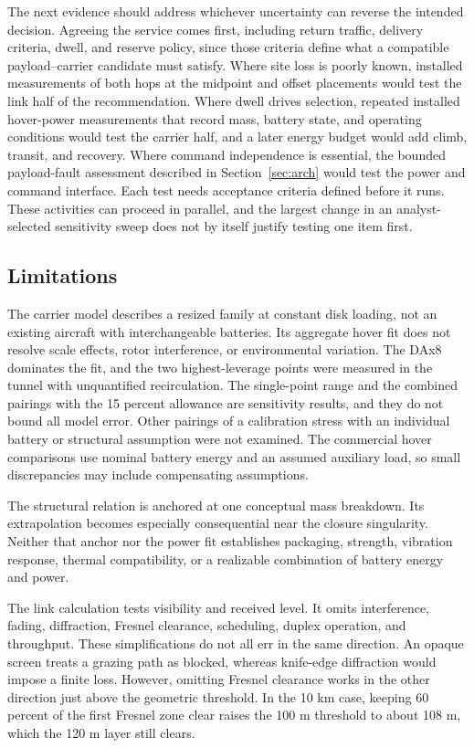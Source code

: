 \documentclass[twocolumn,letterpaper]{IEEEAerospaceCLS}
\begin{document}
The next evidence should address whichever uncertainty can reverse the intended decision. Agreeing the service comes first, including return traffic, delivery criteria, dwell, and reserve policy, since those criteria define what a compatible payload--carrier candidate must satisfy. Where site loss is poorly known, installed measurements of both hops at the midpoint and offset placements would test the link half of the recommendation. Where dwell drives selection, repeated installed hover-power measurements that record mass, battery state, and operating conditions would test the carrier half, and a later energy budget would add climb, transit, and recovery. Where command independence is essential, the bounded payload-fault assessment described in Section~\ref{sec:arch} would test the power and command interface. Each test needs acceptance criteria defined before it runs. These activities can proceed in parallel, and the largest change in an analyst-selected sensitivity sweep does not by itself justify testing one item first.

\subsection{Limitations}

The carrier model describes a resized family at constant disk loading, not an existing aircraft with interchangeable batteries. Its aggregate hover fit does not resolve scale effects, rotor interference, or environmental variation. The DAx8 dominates the fit, and the two highest-leverage points were measured in the tunnel with unquantified recirculation. The single-point range and the combined pairings with the 15 percent allowance are sensitivity results, and they do not bound all model error. Other pairings of a calibration stress with an individual battery or structural assumption were not examined. The commercial hover comparisons use nominal battery energy and an assumed auxiliary load, so small discrepancies may include compensating assumptions.

The structural relation is anchored at one conceptual mass breakdown. Its extrapolation becomes especially consequential near the closure singularity. Neither that anchor nor the power fit establishes packaging, strength, vibration response, thermal compatibility, or a realizable combination of battery energy and power.

The link calculation tests visibility and received level. It omits interference, fading, diffraction, Fresnel clearance, scheduling, duplex operation, and throughput. These simplifications do not all err in the same direction. An opaque screen treats a grazing path as blocked, whereas knife-edge diffraction would impose a finite loss. However, omitting Fresnel clearance works in the other direction just above the geometric threshold. In the 10 km case, keeping 60 percent of the first Fresnel zone clear raises the 100 m threshold to about 108 m, which the 120 m layer still clears.
\end{document}
